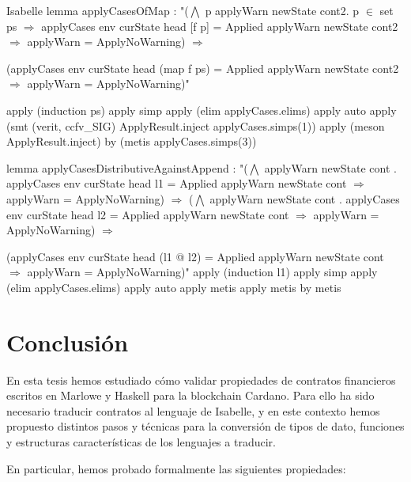 \documentclass[12pt]{book}
\begin{document}
\begin{code}[title=Lemas auxiliares para la prueba sobre \textit{applyInput}.]{Isabelle}
lemma applyCasesOfMap : 
    "($\bigwedge$ p applyWarn newState cont2. p $\in$ set ps $\Rightarrow$ applyCases env curState head [f p] =
                Applied applyWarn newState cont2 $\Rightarrow$ applyWarn = ApplyNoWarning) $\Rightarrow$ 

     (applyCases env curState head (map f ps) =
                Applied applyWarn newState cont2 $\Rightarrow$ applyWarn = ApplyNoWarning)"

  apply (induction ps)
    apply simp
  apply (elim applyCases.elims)
           apply auto
    apply (smt (verit, ccfv_SIG) ApplyResult.inject applyCases.simps(1))
   apply (meson ApplyResult.inject)
  by (metis applyCases.simps(3))


lemma applyCasesDistributiveAgainstAppend : 
    "($\bigwedge$ applyWarn newState cont . applyCases env curState head l1 =
                 Applied applyWarn newState cont $\Rightarrow$ applyWarn = ApplyNoWarning) $\Rightarrow$ 
     ($\bigwedge$ applyWarn newState cont . applyCases env curState head l2 =
                 Applied applyWarn newState cont $\Rightarrow$ applyWarn = ApplyNoWarning) $\Rightarrow$ 

     (applyCases env curState head (l1 @ l2) =
                 Applied applyWarn newState cont $\Rightarrow$ applyWarn = ApplyNoWarning)"
  apply (induction l1)
   apply simp
  apply (elim applyCases.elims)
           apply auto
    apply metis
  apply metis
  by metis
\end{code}




\chapter{Conclusión}

En esta tesis hemos estudiado cómo validar propiedades de contratos financieros escritos en Marlowe y Haskell para la blockchain Cardano. Para ello ha sido necesario traducir contratos al lenguaje de Isabelle, y en este contexto hemos propuesto distintos pasos y técnicas para la conversión de tipos de dato, funciones y estructuras características de los lenguajes a traducir.


En particular, hemos probado formalmente las siguientes propiedades:
\end{document}
